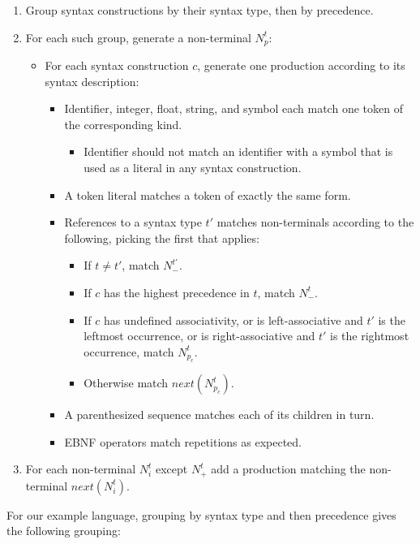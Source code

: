 \documentclass{kththesis}
\begin{document}
\begin{enumerate}
  \item Group syntax constructions by their syntax type, then by precedence.
  \item For each such group, generate a non-terminal $N^t_p$:
  \begin{itemize}
    \item For each syntax construction $c$, generate one production according to its syntax description:
    \begin{itemize}
      \item Identifier, integer, float, string, and symbol each match one token of the corresponding kind.
      \begin{itemize}
        \item Identifier should not match an identifier with a symbol that is used as a literal in any syntax construction.
      \end{itemize}
      \item A token literal matches a token of exactly the same form.
      \item References to a syntax type $t'$ matches non-terminals according to the following, picking the first that applies:
      \begin{itemize}
        \item If $t \neq t'$, match $N^{t'}_-$.
        \item If $c$ has the highest precedence in $t$, match $N^t_-$.
        \item If $c$ has undefined associativity, or is left-associative and $t'$ is the leftmost occurrence, or is right-associative and $t'$ is the rightmost occurrence, match $N^t_{p_c}$.
        \item Otherwise match $next(N^t_{p_c})$.
      \end{itemize}
      \item A parenthesized sequence matches each of its children in turn.
      \item EBNF operators match repetitions as expected.
    \end{itemize}
  \end{itemize}
  \item For each non-terminal $N^t_i$ except $N^t_+$ add a production matching the non-terminal $next(N^t_i)$.
\end{enumerate}
\mathligson

For our example language, grouping by syntax type and then precedence gives the following grouping:
\end{document}
